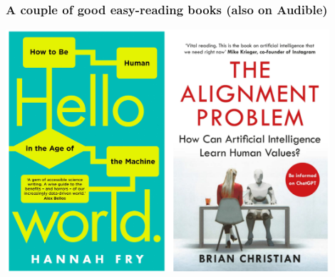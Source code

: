 \begin{frame}
\frametitle{A couple of good easy-reading books (also on Audible)}

\begin{center}
    \includegraphics[width=0.9\textwidth]{./misc_images/books}
\end{center}


\end{frame}